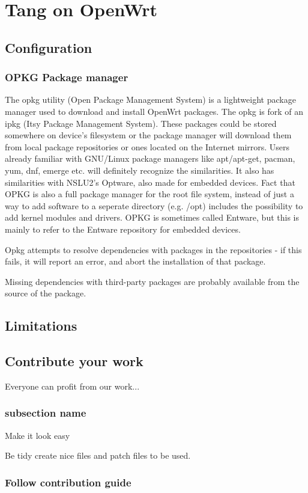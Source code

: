\chapter{Tang on OpenWrt}\label{config}

\section{Configuration}




\subsection{OPKG Package manager}

The opkg utility (Open Package Management System) is a lightweight package manager used to download and install OpenWrt packages.
The opkg is fork of an ipkg (Itsy Package Management System).
These packages could be stored somewhere on device's filesystem or the package manager will download them from local package repositories or ones located on the Internet mirrors.
Users already familiar with GNU/Linux package managers like apt/apt-get, pacman, yum, dnf, emerge etc. will definitely recognize the similarities.
It also has similarities with NSLU2's Optware, also made for embedded devices.
Fact that OPKG is also a full package manager for the root file system, instead of just a way to add software to a seperate directory (e.g. /opt) includes the possibility to add kernel modules and drivers.
OPKG is sometimes called Entware, but this is mainly to refer to the Entware repository for embedded devices.

Opkg attempts to resolve dependencies with packages in the repositories - if this fails, it will report an error, and abort the installation of that package.

Missing dependencies with third-party packages are probably available from the source of the package.

\section{Limitations}

\section{Contribute your work}\label{contrib}

Everyone can profit from our work...

\subsection{subsection name}
{Make it look easy}

Be tidy create nice files and patch files to be used.

\subsection{Follow contribution guide}


